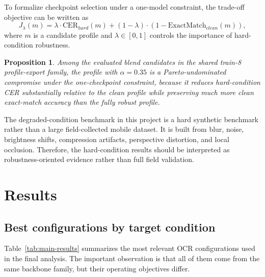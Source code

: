 \documentclass[12pt,a4paper]{article}
\newtheorem{proposition}{Proposition}
\begin{document}
To formalize checkpoint selection under a one-model constraint, the trade-off objective can be written as
\begin{equation}
J_{\lambda}(m) = \lambda \cdot \mathrm{CER}_{hard}(m) + (1-\lambda)\cdot \left(1-\mathrm{ExactMatch}_{clean}(m)\right),
\end{equation}
where $m$ is a candidate profile and $\lambda \in [0,1]$ controls the importance of hard-condition robustness.

\begin{proposition}
Among the evaluated blend candidates in the shared train-8 profile-export family, the profile with $\alpha = 0.35$ is a Pareto-undominated compromise under the one-checkpoint constraint, because it reduces hard-condition CER substantially relative to the clean profile while preserving much more clean exact-match accuracy than the fully robust profile.
\end{proposition}

The degraded-condition benchmark in this project is a hard synthetic benchmark rather than a large field-collected mobile dataset. It is built from blur, noise, brightness shifts, compression artifacts, perspective distortion, and local occlusion. Therefore, the hard-condition results should be interpreted as robustness-oriented evidence rather than full field validation.

\section{Results}
\subsection{Best configurations by target condition}
Table~\ref{tab:main-results} summarizes the most relevant OCR configurations used in the final analysis. The important observation is that all of them come from the same backbone family, but their operating objectives differ.
\end{document}
